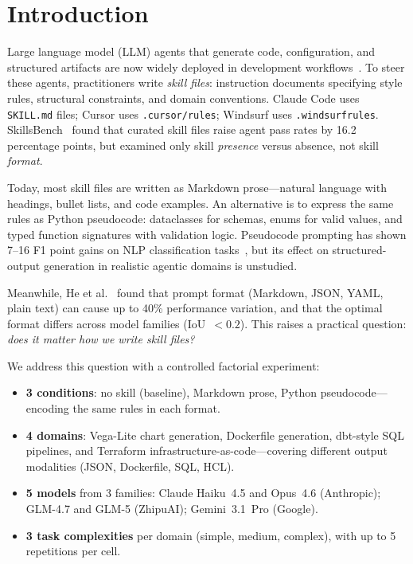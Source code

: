 \documentclass[sigconf,nonacm]{acmart}
\begin{document}
\section{Introduction}\label{sec:intro}

Large language model (LLM) agents that generate code, configuration, and
structured artifacts are now widely deployed in development
workflows~\cite{plaat2025agentic}. To steer these agents, practitioners write
\emph{skill files}: instruction documents specifying style rules, structural
constraints, and domain conventions. Claude Code uses \texttt{SKILL.md}
files; Cursor uses \texttt{.cursor/rules}; Windsurf uses
\texttt{.windsurfrules}. SkillsBench~\cite{li2026skillsbench} found that
curated skill files raise agent pass rates by 16.2 percentage points, but
examined only skill \emph{presence} versus absence, not skill \emph{format}.

Today, most skill files are written as Markdown prose---natural language with
headings, bullet lists, and code examples. An alternative is to express the
same rules as Python pseudocode: dataclasses for schemas, enums for valid
values, and typed function signatures with validation logic. Pseudocode
prompting has shown 7--16 F1 point gains on NLP classification
tasks~\cite{mishra2023prompting}, but its effect on structured-output
generation in realistic agentic domains is unstudied.

Meanwhile, He et al.~\cite{he2024prompt} found that prompt format (Markdown,
JSON, YAML, plain text) can cause up to 40\% performance variation, and that
the optimal format differs across model families (IoU~$< 0.2$). This
raises a practical question: \emph{does it matter how we write skill files?}

We address this question with a controlled factorial experiment:

\begin{itemize}
  \item \textbf{3 conditions}: no skill (baseline), Markdown prose, Python
    pseudocode---encoding the same rules in each format.
  \item \textbf{4 domains}: Vega-Lite chart generation, Dockerfile generation,
    dbt-style SQL pipelines, and Terraform
    infrastructure-as-code---covering different output modalities
    (JSON, Dockerfile, SQL, HCL).
  \item \textbf{5 models} from 3 families: Claude Haiku~4.5 and Opus~4.6
    (Anthropic); GLM-4.7 and GLM-5 (ZhipuAI); Gemini~3.1~Pro (Google).
  \item \textbf{3 task complexities} per domain (simple, medium, complex),
    with up to 5 repetitions per cell.
\end{itemize}
\end{document}
